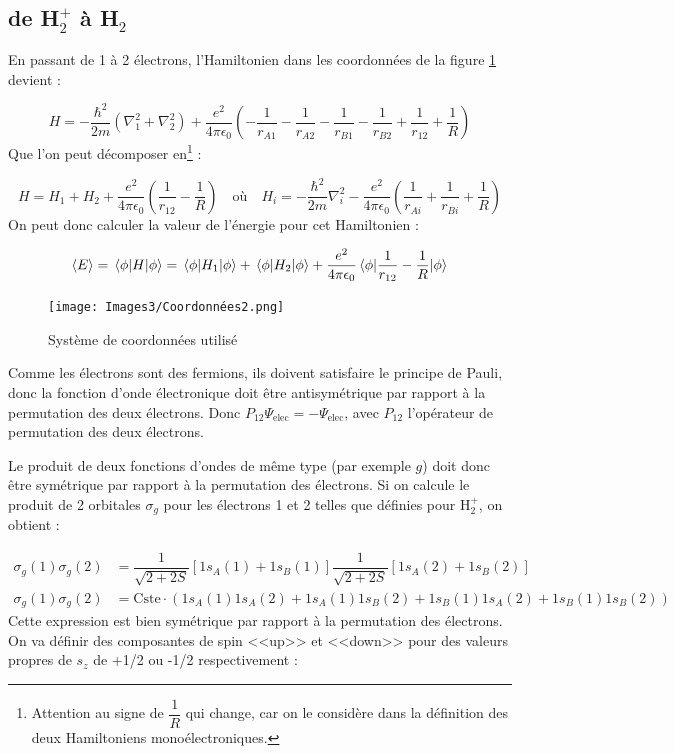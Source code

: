 \subsection{de \textnormal{H}$_2^+$ à \textnormal{H}$_2$}
En passant de 1 à 2 électrons, l'Hamiltonien dans les coordonnées de la figure \ref{fig:Coor} devient :

\[
    H = -\dfrac{\hbar^2}{2m}(\nabla^2_1+\nabla^2_2) + \dfrac{e^2}{4\pi\epsilon_0}\left(-\dfrac{1}{r_{A1}}-\dfrac{1}{r_{A2}}-\dfrac{1}{r_{B1}}-\dfrac{1}{r_{B2}}+\dfrac{1}{r_{12}}+\dfrac{1}{R}\right)
\]
Que l'on peut décomposer en\footnote{Attention au signe de $\dfrac{1}{R}$ qui change, car on le considère dans la définition des deux Hamiltoniens monoélectroniques.} :

\[
    H = H_1 + H_2 +\dfrac{e^2}{4\pi\epsilon_0}\left(\dfrac{1}{r_{12}}-\dfrac{1}{R}\right) \quad \textrm{où} \quad H_i = -\dfrac{\hbar^2}{2m}\nabla^2_i - \dfrac{e^2}{4\pi\epsilon_0}\left(\dfrac{1}{r_{Ai}}+\dfrac{1}{r_{Bi}}+\dfrac{1}{R}\right)
\]
On peut donc calculer la valeur de l'énergie pour cet Hamiltonien :

\[
    \langle E \rangle = \mel{\phi}{H}{\phi} = \mel{\phi}{H_1}{\phi} + \mel{\phi}{H_2}{\phi} + \dfrac{e^2}{4\pi\epsilon_0}\mel{\phi}{\dfrac{1}{r_{12}}-\dfrac{1}{R}}{\phi}
\]
\begin{figure}[htpb]
    \centering
    \texttt{[image: Images3/Coordonnées2.png]}
    \caption{Système de coordonnées utilisé}
    \label{fig:Coor}
\end{figure}
Comme les électrons sont des fermions, ils doivent satisfaire le principe de Pauli, donc la fonction d'onde électronique doit être antisymétrique par rapport à la permutation des deux électrons. Donc $P_{12}\Psi_\text{elec} = -\Psi_\text{elec}$, avec $P_{12}$ l'opérateur de permutation des deux électrons.

Le produit de deux fonctions d'ondes de même type (par exemple $g$) doit donc être symétrique par rapport à la permutation des électrons. Si on calcule le produit de 2 orbitales $\sigma_g$ pour les électrons 1 et 2 telles que définies pour H$^+_2$, on obtient :

\begin{align*}
    \sigma_g(1)\sigma_g(2) &= \dfrac{1}{\sqrt{2+2S}}[1s_A(1)+1s_B(1)] \dfrac{1}{\sqrt{2+2S}}[1s_A(2)+1s_B(2)]\\
    \sigma_g(1)\sigma_g(2) &= \text{Cste} \cdot (1s_A(1)1s_A(2)+1s_A(1)1s_B(2)+1s_B(1)1s_A(2)+1s_B(1)1s_B(2))
\end{align*}
Cette expression est bien symétrique par rapport à la permutation des électrons. On va définir des composantes de spin <<up>> et <<down>> pour des valeurs propres de $s_z$ de +1/2 ou -1/2 respectivement :

